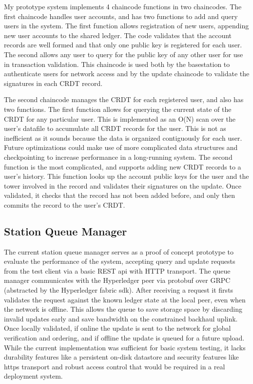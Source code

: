 My prototype system implements 4 chaincode functions in two
chaincodes. The first chaincode handles user accounts, and has two
functions to add and query users in the system. The first function
allows registration of new users, appending new user accounts to the
shared ledger. The code validates that the account records are well
formed and that only one public key is registered for each user. The
second allows any user to query for the public key of any other user
for use in transaction validation. This chaincode is used both by the
basestation to authenticate users for network access and by the update
chaincode to validate the signatures in each CRDT record.

The second chaincode manages the CRDT for each registered user, and
also has two functions. The first function allows for querying the
current state of the CRDT for any particular user. This is implemented
as an O(N) scan over the user's datafile to accumulate all CRDT
records for the user. This is not as inefficient as it sounds because
the data is organized contiguously for each user. Future optimizations
could make use of more complicated data structures and checkpointing
to increase performance in a long-running system. The second function
is the most complicated, and supports adding new CRDT records to a
user's history. This function looks up the account public keys for the
user and the tower involved in the record and validates their
signatures on the update. Once validated, it checks that the record
has not been added before, and only then commits the record to the
user's CRDT.

\subsection{Station Queue Manager}

The current station queue manager serves as a proof of concept
prototype to evaluate the performance of the system, accepting query
and update requests from the test client via a basic REST api with
HTTP transport. The queue manager communicates with the Hyperledger
peer via protobuf over GRPC (abstracted by the Hyperledger fabric
sdk). After receiving a request it firsts validates the request
against the known ledger state at the local peer, even when the
network is offline. This allows the queue to save storage space by
discarding invalid updates early and save bandwidth on the constrained
backhaul uplink. Once locally validated, if online the update is sent
to the network for global verification and ordering, and if offline
the update is queued for a future upload. While the current
implementation was sufficient for basic system testing, it lacks
durability features like a persistent on-disk datastore and security
features like https transport and robust access control that would be
required in a real deployment system.


